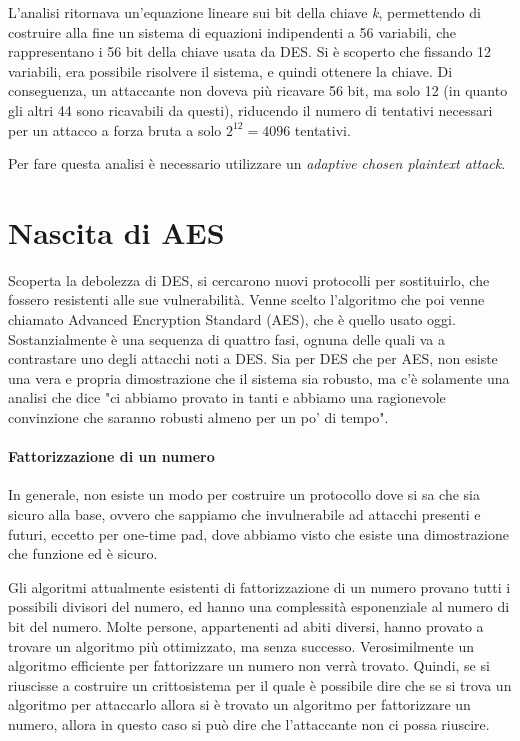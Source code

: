 \noindent L'analisi ritornava un'equazione lineare sui bit della chiave \textit{k}, permettendo di costruire alla fine un sistema di equazioni indipendenti a 56 variabili, che rappresentano i 56 bit della chiave usata da DES. Si è scoperto che fissando 12 variabili, era possibile risolvere il sistema, e quindi ottenere la chiave. Di conseguenza, un attaccante non doveva più ricavare 56 bit, ma solo 12 (in quanto gli altri 44 sono ricavabili da questi), riducendo il numero di tentativi necessari per un attacco a forza bruta a solo $2^{12} = 4096$ tentativi.

\noindent Per fare questa analisi è necessario utilizzare un \textit{adaptive chosen plaintext attack}.

\section{Nascita di AES} 
Scoperta la debolezza di DES, si cercarono nuovi protocolli per sostituirlo, che fossero resistenti alle sue vulnerabilità. Venne scelto l'algoritmo che poi venne chiamato Advanced Encryption Standard (AES), che è quello usato oggi. Sostanzialmente è una sequenza di quattro fasi, ognuna delle quali va a contrastare uno degli attacchi noti a DES. Sia per DES che per AES, non esiste una vera e propria dimostrazione che il sistema sia robusto, ma c'è solamente una analisi che dice "ci abbiamo provato in tanti e abbiamo una ragionevole convinzione che saranno robusti almeno per un po' di tempo". 

\paragraph{Fattorizzazione di un numero} In generale, non esiste un modo per costruire un protocollo dove si sa che sia sicuro alla base, ovvero che sappiamo che invulnerabile ad attacchi presenti e futuri, eccetto per one-time pad, dove abbiamo visto che esiste una dimostrazione che funzione ed è sicuro. 

Gli algoritmi attualmente esistenti di fattorizzazione di un numero provano tutti i possibili divisori del numero, ed hanno una complessità esponenziale al numero di bit del numero. Molte persone, appartenenti ad abiti diversi, hanno provato a trovare un algoritmo più ottimizzato, ma senza successo. Verosimilmente un algoritmo efficiente per fattorizzare un numero non verrà trovato. Quindi, se si riuscisse a costruire un crittosistema per il quale è possibile dire che se si trova un algoritmo per attaccarlo allora si è trovato un algoritmo per fattorizzare un numero, allora in questo caso si può dire che l'attaccante non ci possa riuscire. 

